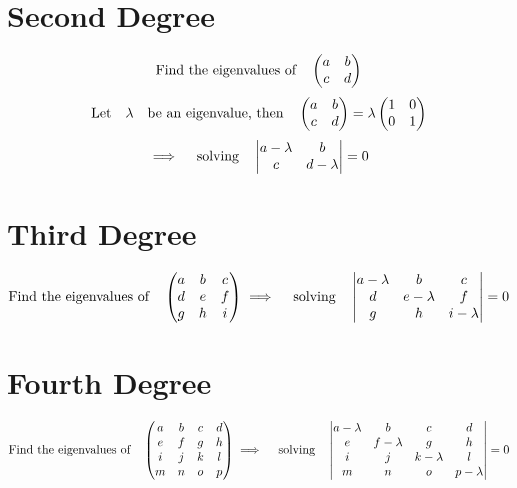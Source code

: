 \documentclass[letterpaper]{article}
\begin{document}
\section*{Second Degree}
\[\qq*{Find the eigenvalues of}
  \begin{pmatrix}
    a & b \\c&d\\
  \end{pmatrix}
\]
\[\qq*{Let}\lambda\qq{be an eigenvalue, then}
  \begin{pmatrix}
    a & b \\c&d\\
  \end{pmatrix}=\lambda\begin{pmatrix}\imat{2}\end{pmatrix}
\]
\[\implies\qq{solving}
  \mdet{a-\lambda & b \\c&d-\lambda}
  =0
\]

\section*{Third Degree}
\[\qq*{Find the eigenvalues of}
  \begin{pmatrix}
    a & b & c \\d&e&f\\g&h&i
  \end{pmatrix}\implies\qq{solving}
  \mdet{a-\lambda & b &c\\d&e-\lambda&f\\g&h&i-\lambda}
  =0
\]

\section*{Fourth Degree}
\[\qq*{Find the eigenvalues of}
  \begin{pmatrix}
    a & b & c & d \\e&f&g&h\\i&j&k&l\\m&n&o&p
  \end{pmatrix}\implies\qq{solving}
  \mdet{a-\lambda & b& c&d\\e&f-\lambda&g&h\\i&j&k-\lambda&l\\m&n&o&p-\lambda}
  =0
\]
\end{document}
